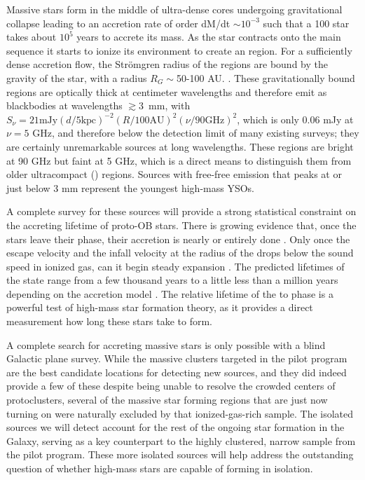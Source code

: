 \documentclass[11pt,preprint]{aastex_nofoot}
\begin{document}
Massive stars form in the middle of ultra-dense cores undergoing gravitational
collapse leading to an accretion rate of order dM/dt $\sim 10^{-3}$ \msun
\peryr such that a 100 \msun star takes about $10^5$ years to accrete its mass.  
As the star contracts onto the main sequence it starts to ionize its
environment to create an \hchii region.  For a sufficiently dense accretion
flow, the Strömgren radius of the \hchii regions are bound by the gravity of
the star, with a radius $R_G \sim$50-100 AU.
\citep{Keto2002a,Keto2003a,Keto2007a}.  These gravitationally bound \hchii
regions are optically thick at centimeter wavelengths and therefore emit as
blackbodies at wavelengths $\gtrsim$3~mm, with $S_\nu=21 \textrm{mJy} (d/5
\textrm{kpc})^{-2} (R/100 \textrm{AU})^2(\nu/90 \textrm{GHz})^2$, which is only
0.06 mJy at $\nu=5$ GHz, and therefore below the detection limit of many
existing surveys; they are certainly unremarkable sources at long wavelengths.
These \hchii regions are bright at 90 GHz but faint at 5 GHz, which is a direct
means to distinguish them from older ultracompact (\uchii) regions.  Sources
with free-free emission that peaks at or just below 3 mm represent the youngest
high-mass YSOs.

A complete survey for these sources will provide a strong statistical
constraint on the accreting lifetime of proto-OB stars.  There is growing
evidence that, once the stars leave their \hchii phase, their accretion is
nearly or entirely done \citep[e.g.,][]{Goddi2018a}.  Only once the escape
velocity and the infall velocity at the radius of the \hchii drops below the
sound speed in ionized gas, can it begin steady expansion \citep{Keto2006a}.
The predicted lifetimes of the \hchii state range from a few thousand years to
a little less than a million years depending on the accretion model
\citep{Keto2003a,Zhang2018a}.
The relative lifetime of the \hchii to \uchii phase is a powerful
test of high-mass star formation theory, as it provides a direct measurement
how long these stars take to form.


A complete search for accreting massive stars is only possible with a blind Galactic
plane survey.  While the massive clusters targeted in the pilot program are the
best candidate locations for detecting new sources, and they did indeed provide
a few of these despite being unable to resolve the crowded centers of
protoclusters, several of the massive star forming regions that are just now
turning on were naturally excluded by that ionized-gas-rich sample.  The
isolated sources we will detect account for the rest of the ongoing star
formation in the Galaxy, serving as a key counterpart to the highly clustered,
narrow sample from the pilot program.  These more isolated sources will
help address the outstanding question of whether high-mass stars are
capable of forming in isolation.
\end{document}
